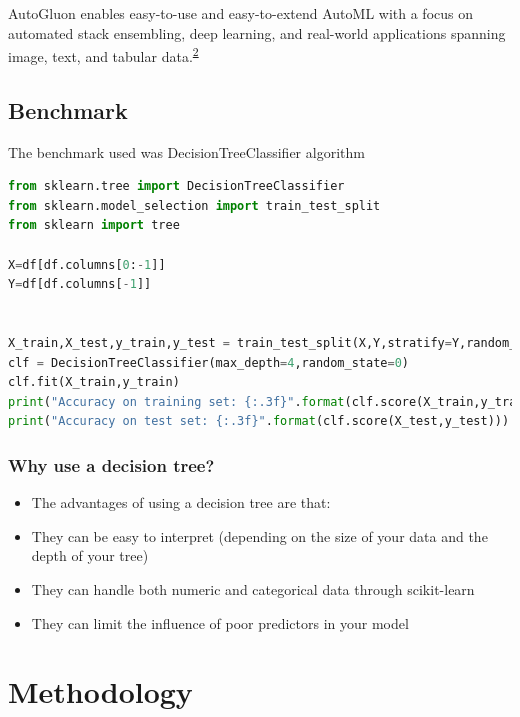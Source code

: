 \documentclass[
]{article}
\begin{document}
AutoGluon enables easy-to-use and easy-to-extend AutoML with a focus on
automated stack ensembling, deep learning, and real-world applications
spanning image, text, and tabular
data.\textsuperscript{\protect\hyperlink{ref-auto}{2}}

\hypertarget{benchmark}{%
\subsection{Benchmark}\label{benchmark}}

The benchmark used was DecisionTreeClassifier algorithm

\begin{lstlisting}[language=python]
from sklearn.tree import DecisionTreeClassifier
from sklearn.model_selection import train_test_split
from sklearn import tree

X=df[df.columns[0:-1]]
Y=df[df.columns[-1]]


X_train,X_test,y_train,y_test = train_test_split(X,Y,stratify=Y,random_state=42)
clf = DecisionTreeClassifier(max_depth=4,random_state=0)
clf.fit(X_train,y_train)
print("Accuracy on training set: {:.3f}".format(clf.score(X_train,y_train)))
print("Accuracy on test set: {:.3f}".format(clf.score(X_test,y_test)))

\end{lstlisting}

\hypertarget{why-use-a-decision-tree}{%
\subsubsection{Why use a decision tree?}\label{why-use-a-decision-tree}}

\begin{itemize}
\item
  The advantages of using a decision tree are that:
\item
  They can be easy to interpret (depending on the size of your data and
  the depth of your tree)
\item
  They can handle both numeric and categorical data through scikit-learn
\item
  They can limit the influence of poor predictors in your model
\end{itemize}

\hypertarget{methodology}{%
\section{Methodology}\label{methodology}}
\end{document}
